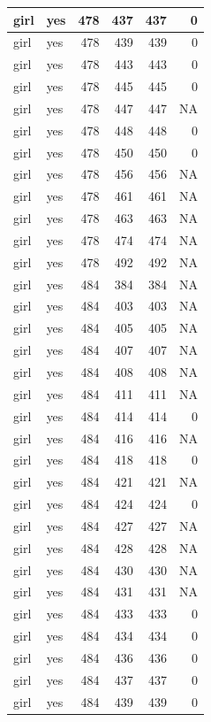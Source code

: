 \documentclass[man]{apa6}
\begin{document}
\begin{tabular}{l|l|r|r|r|r}
\hline
girl & yes & 478 & 437 & 437 & 0\\
\hline
girl & yes & 478 & 439 & 439 & 0\\
\hline
girl & yes & 478 & 443 & 443 & 0\\
\hline
girl & yes & 478 & 445 & 445 & 0\\
\hline
girl & yes & 478 & 447 & 447 & NA\\
\hline
girl & yes & 478 & 448 & 448 & 0\\
\hline
girl & yes & 478 & 450 & 450 & 0\\
\hline
girl & yes & 478 & 456 & 456 & NA\\
\hline
girl & yes & 478 & 461 & 461 & NA\\
\hline
girl & yes & 478 & 463 & 463 & NA\\
\hline
girl & yes & 478 & 474 & 474 & NA\\
\hline
girl & yes & 478 & 492 & 492 & NA\\
\hline
girl & yes & 484 & 384 & 384 & NA\\
\hline
girl & yes & 484 & 403 & 403 & NA\\
\hline
girl & yes & 484 & 405 & 405 & NA\\
\hline
girl & yes & 484 & 407 & 407 & NA\\
\hline
girl & yes & 484 & 408 & 408 & NA\\
\hline
girl & yes & 484 & 411 & 411 & NA\\
\hline
girl & yes & 484 & 414 & 414 & 0\\
\hline
girl & yes & 484 & 416 & 416 & NA\\
\hline
girl & yes & 484 & 418 & 418 & 0\\
\hline
girl & yes & 484 & 421 & 421 & NA\\
\hline
girl & yes & 484 & 424 & 424 & 0\\
\hline
girl & yes & 484 & 427 & 427 & NA\\
\hline
girl & yes & 484 & 428 & 428 & NA\\
\hline
girl & yes & 484 & 430 & 430 & NA\\
\hline
girl & yes & 484 & 431 & 431 & NA\\
\hline
girl & yes & 484 & 433 & 433 & 0\\
\hline
girl & yes & 484 & 434 & 434 & 0\\
\hline
girl & yes & 484 & 436 & 436 & 0\\
\hline
girl & yes & 484 & 437 & 437 & 0\\
\hline
girl & yes & 484 & 439 & 439 & 0\\

\end{tabular}
\end{document}
